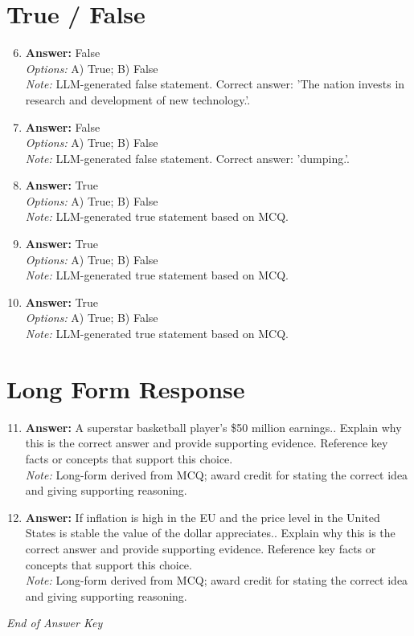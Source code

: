 \documentclass[12pt]{article}
\begin{document}
\section*{True / False}
\begin{enumerate}[label=\arabic*.]
\setcounter{enumi}{5}
\item \textbf{Answer:} False
\\ \textit{Options:} A) True; B) False
\\ \textit{Note:} LLM-generated false statement. Correct answer: 'The nation invests in research and development of new technology.'.
\item \textbf{Answer:} False
\\ \textit{Options:} A) True; B) False
\\ \textit{Note:} LLM-generated false statement. Correct answer: 'dumping.'.
\item \textbf{Answer:} True
\\ \textit{Options:} A) True; B) False
\\ \textit{Note:} LLM-generated true statement based on MCQ.
\item \textbf{Answer:} True
\\ \textit{Options:} A) True; B) False
\\ \textit{Note:} LLM-generated true statement based on MCQ.
\item \textbf{Answer:} True
\\ \textit{Options:} A) True; B) False
\\ \textit{Note:} LLM-generated true statement based on MCQ.
\end{enumerate}

\section*{Long Form Response}
\begin{enumerate}[label=\arabic*.]
\setcounter{enumi}{10}
\item \textbf{Answer:} A superstar basketball player's \$50 million earnings.. Explain why this is the correct answer and provide supporting evidence. Reference key facts or concepts that support this choice.
\\ \textit{Note:} Long-form derived from MCQ; award credit for stating the correct idea and giving supporting reasoning.
\item \textbf{Answer:} If inflation is high in the EU and the price level in the United States is stable the value of the dollar appreciates.. Explain why this is the correct answer and provide supporting evidence. Reference key facts or concepts that support this choice.
\\ \textit{Note:} Long-form derived from MCQ; award credit for stating the correct idea and giving supporting reasoning.
\end{enumerate}

\vfill
\noindent\textit{End of Answer Key}
\end{document}
